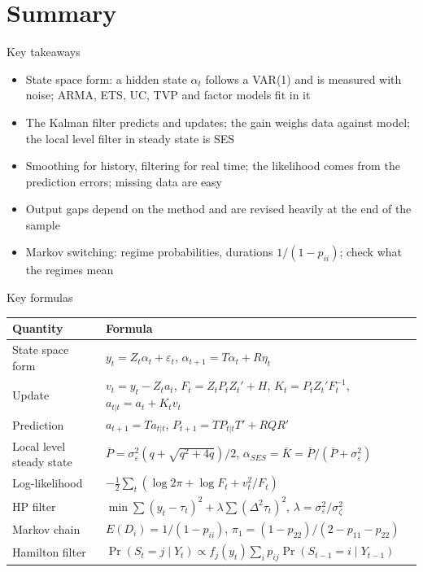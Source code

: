 \section{Summary}

\begin{frame}{Key takeaways}
\itemsize{\small}
\begin{itemize}
    \item State space form: a hidden state $\alpha_t$ follows a VAR(1) and is measured with noise; ARMA, ETS, UC, TVP and factor models fit in it
    \item The Kalman filter predicts and updates; the gain weighs data against model; the local level filter in steady state is SES
    \item Smoothing for history, filtering for real time; the likelihood comes from the prediction errors; missing data are easy
    \item Output gaps depend on the method and are revised heavily at the end of the sample
    \item Markov switching: regime probabilities, durations $1/(1 - p_{ii})$; check what the regimes mean
\end{itemize}
\end{frame}

\begin{frame}{Key formulas}
\itemsize{\small}
{\renewcommand{\arraystretch}{1.35}\begin{center}
\footnotesize
\begin{tabular}{ll}
\toprule
\textbf{Quantity} & \textbf{Formula} \\
\midrule
State space form & $y_t = Z_t\alpha_t + \varepsilon_t$, \quad $\alpha_{t+1} = T\alpha_t + R\eta_t$ \\
Update & $v_t = y_t - Z_ta_t$, \quad $F_t = Z_tP_tZ_t' + H$, \quad $K_t = P_tZ_t'F_t^{-1}$, \quad $a_{t|t} = a_t + K_tv_t$ \\
Prediction & $a_{t+1} = Ta_{t|t}$, \quad $P_{t+1} = TP_{t|t}T' + RQR'$ \\
Local level steady state & $\bar P = \sigma^2_\varepsilon(q + \sqrt{q^2 + 4q})/2$, \quad $\alpha_{SES} = \bar K = \bar P/(\bar P + \sigma^2_\varepsilon)$ \\
Log-likelihood & $-\frac12\sum_t(\log 2\pi + \log F_t + v_t^2/F_t)$ \\
HP filter & $\min\sum(y_t - \tau_t)^2 + \lambda\sum(\Delta^2\tau_t)^2$, \quad $\lambda = \sigma^2_\varepsilon/\sigma^2_\zeta$ \\
Markov chain & $E(D_i) = 1/(1 - p_{ii})$, \quad $\pi_1 = (1 - p_{22})/(2 - p_{11} - p_{22})$ \\
Hamilton filter & $\Pr(S_t = j \mid Y_t) \propto f_j(y_t)\sum_i p_{ij}\Pr(S_{t-1} = i \mid Y_{t-1})$ \\
\bottomrule
\end{tabular}
\end{center}
}
\end{frame}


